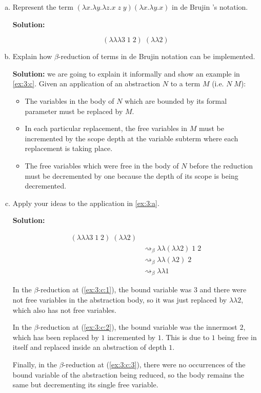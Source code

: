 \documentclass{article}
\begin{document}
\begin{enumerate}[a)]
  \item\label{ex:3:a} Represent the term 
    $(\lambda x.\lambda y.\lambda z.x\;z\;y)(\lambda x.\lambda y.x)$
    in de Brujin 's notation.

    \textbf{Solution:}

    $$(\lambda\lambda\lambda 3\;1\;2)\;(\lambda\lambda 2)$$
  \item Explain how $\beta$-reduction of terms in de Brujin
    notation can be implemented.
  
    \textbf{Solution:} we are going to explain it informally 
    and show an example in \ref{ex:3:c}. Given an application 
    of an abstraction $N$ to a term $M$ (i.e. $N\;M$):

    \begin{itemize}
      \item The variables in the body of $N$ which are bounded 
        by its formal parameter must be replaced by $M$. 
      \item In each particular replacement, the free variables in 
       $M$ must be incremented by the scope depth at the variable 
        subterm where each replacement is taking place.
      \item The free variables which were free in the body of $N$ 
        before the reduction must be decremented by one because 
        the depth of its scope is being decremented.
    \end{itemize}
  \item\label{ex:3:c} Apply your ideas to the application 
    in \ref{ex:3:a}.
    
    \textbf{Solution:} 

    \begin{align*}
      (\lambda\lambda\lambda 3\;1\;2)\;(\lambda\lambda 2) \\ 
        &\rightsquigarrow_\beta 
          \lambda\lambda (\lambda\lambda 2)\;1\;2 
          \label{ex:3:c:1}\tag{1} \\ 
        &\rightsquigarrow_\beta 
          \lambda\lambda (\lambda 2)\;2 
          \label{ex:3:c:2}\tag{2} \\ 
        &\rightsquigarrow_\beta 
          \lambda\lambda 1 
          \label{ex:3:c:3}\tag{3}
    \end{align*}

    In the $\beta$-reduction at (\ref{ex:3:c:1}), the bound 
    variable was $3$ and there were not free variables 
    in the abstraction body, so it was just replaced by 
    $\lambda\lambda2$, which also has not free variables. 

    In the $\beta$-reduction at (\ref{ex:3:c:2}), the bound 
    variable was the innermost $2$, which has been replaced 
    by $1$ incremented by $1$. This is due to $1$ being free 
    in itself and replaced inside an abstraction of depth $1$.

    Finally, in the $\beta$-reduction at (\ref{ex:3:c:3}), 
    there were no occurrences of the bound variable of the 
    abstraction being reduced, so the body remains the same but 
    decrementing its single free variable.
\end{enumerate}
\end{document}
